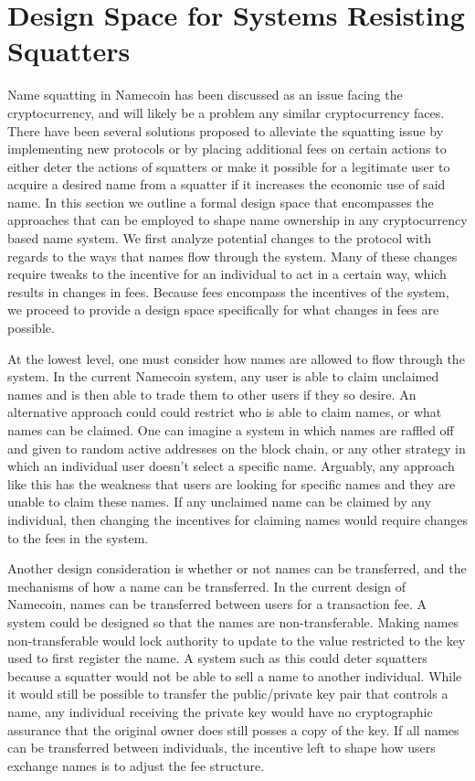 \section{Design Space for Systems Resisting Squatters}
\label{sec:analysis}

    Name squatting in Namecoin has been discussed as an issue facing the cryptocurrency, and will likely be a problem any similar cryptocurrency faces. There have been several solutions proposed to alleviate the squatting issue by implementing new protocols or by placing additional fees on certain actions to either deter the actions of squatters or make it possible for a legitimate user to acquire a desired name from a squatter if it increases the economic use of said name. In this section we outline a formal design space that encompasses the approaches that can be employed to shape name ownership in any cryptocurrency based name system. We first analyze potential changes to the protocol with regards to the ways that names flow through the system. Many of these changes require tweaks to the incentive for an individual to act in a certain way, which results in changes in fees. Because fees encompass the incentives of the system, we proceed to provide a design space specifically for what changes in fees are possible.

    At the lowest level, one must consider how names are allowed to flow through the system. In the current Namecoin system, any user is able to claim unclaimed names and is then able to trade them to other users if they so desire. An alternative approach could could restrict who is able to claim names, or what names can be claimed. One can imagine a system in which names are raffled off and given to random active addresses on the block chain, or any other strategy in which an individual user doesn't select a specific name. Arguably, any approach like this has the weakness that users are looking for specific names and they are unable to claim these names. If any unclaimed name can be claimed by any individual, then changing the incentives for claiming names would require changes to the fees in the system.

    Another design consideration is whether or not names can be transferred, and the mechanisms of how a name can be transferred. In the current design of Namecoin, names can be transferred between users for a transaction fee. A system could be designed so that the names are non-transferable. Making names non-transferable would lock authority to update to the value restricted to the key used to first register the name. A system such as this could deter squatters because a squatter would not be able to sell a name to another individual. While it would still be possible to transfer the public/private key pair that controls a name, any individual receiving the private key would have no cryptographic assurance that the original owner does still posses a copy of the key. If all names can be transferred between individuals, the incentive left to shape how users exchange names is to adjust the fee structure. 

